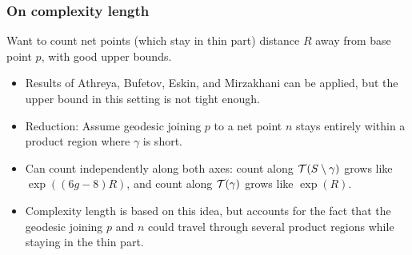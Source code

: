 \begin{frame}
  \frametitle{On complexity length}
   {
    \begin{goal}
      Want to count net points (which stay in thin part) distance $R$ away from base point $p$, with good upper bounds.
    \end{goal}
  }
  \begin{itemize}
  \item<3-> Results of Athreya, Bufetov, Eskin, and Mirzakhani can be applied, but the upper bound in this setting is not tight enough.
  \item<4-> Reduction: Assume geodesic joining $p$ to a net point $n$ stays entirely within a product region where $\gamma$ is short.
  \item<6-> Can count independently along both axes: count along $\mathcal{T}(S \setminus \gamma)$ grows like $\exp((6g-8)R)$, and count along $\mathcal{T}(\gamma)$ grows like $\exp(R)$.
  \item<7-> Complexity length is based on this idea, but accounts for the fact that the geodesic joining $p$ and $n$ could travel through several product regions while staying in the thin part.
  \end{itemize}
\end{frame}

